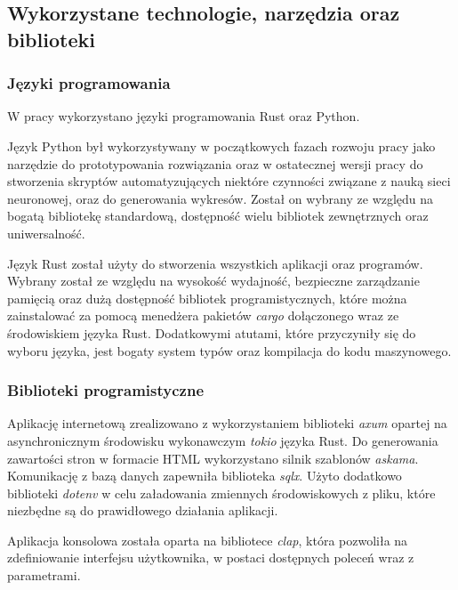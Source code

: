     \subsection{Wykorzystane technologie, narzędzia oraz biblioteki}

        \subsubsection{Języki programowania}

            W pracy wykorzystano języki programowania Rust\cite{Rust} oraz Python\cite{Python}.

            Język Python był wykorzystywany w początkowych fazach rozwoju pracy jako narzędzie do prototypowania rozwiązania oraz w ostatecznej wersji pracy do stworzenia skryptów automatyzujących niektóre czynności związane z nauką sieci neuronowej, oraz do generowania wykresów. Został on wybrany ze względu na bogatą bibliotekę standardową, dostępność wielu bibliotek zewnętrznych oraz uniwersalność.

            Język Rust został użyty do stworzenia wszystkich aplikacji oraz programów. Wybrany został ze względu na wysokość wydajność, bezpieczne zarządzanie pamięcią oraz dużą dostępność bibliotek programistycznych, które można zainstalować za pomocą menedżera pakietów \textit{cargo}\cite{Rust:cargo} dołączonego wraz ze środowiskiem języka Rust. Dodatkowymi atutami, które przyczyniły się do wyboru języka, jest bogaty system typów oraz kompilacja do kodu maszynowego.

        \subsubsection{Biblioteki programistyczne}

            Aplikację internetową zrealizowano z wykorzystaniem biblioteki \textit{axum}\cite{Rust:axum} opartej na asynchronicznym środowisku wykonawczym \textit{tokio}\cite{Rust:tokio} języka Rust.
            Do generowania zawartości stron w formacie HTML wykorzystano silnik szablonów \textit{askama}\cite{Rust:askama}. Komunikację z bazą danych zapewniła biblioteka \textit{sqlx}\cite{Rust:sqlx}. Użyto dodatkowo biblioteki \textit{dotenv}\cite{Rust:dotenv} w celu załadowania zmiennych środowiskowych z pliku, które niezbędne są do prawidłowego działania aplikacji.

            Aplikacja konsolowa została oparta na bibliotece \textit{clap}\cite{Rust:clap}, która pozwoliła na zdefiniowanie interfejsu użytkownika, w postaci dostępnych poleceń wraz z parametrami.

